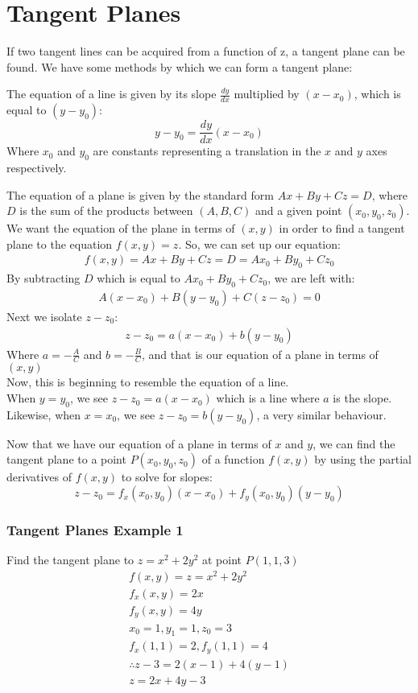 \documentclass[12pt]{article}
\begin{document}
\section{Tangent Planes}
If two tangent lines can be acquired from a function of z, a tangent plane can be found. We have some methods by which we can form a tangent plane:

\noindent The equation of a line is given by its slope \(\frac{dy}{dx}\) multiplied by \((x-x_0)\), which is equal to \((y-y_0)\):
\[
	y-y_0 = \frac{dy}{dx}(x-x_0)
\]
Where \(x_0\) and \(y_0\) are constants representing a translation in the \(x\) and \(y\) axes respectively.

\noindent The equation of a plane is given by the standard form \(Ax + By + Cz = D\), where \(D\) is the sum of the products between \((A,B,C)\) and a given point \((x_0, y_0, z_0)\).\\
We want the equation of the plane in terms of \((x,y)\) in order to find a tangent plane to the equation \(f(x,y)= z\). So, we can set up our equation:
\begin{align}
	f(x,y) = Ax + By + Cz = D = Ax_0 + By_0 + Cz_0
\end{align}
By subtracting \(D\) which is equal to \(Ax_0 + By_0 + Cz_0\), we are left with:
\begin{align}
	A(x-x_0) + B(y-y_0) + C(z-z_0) = 0
\end{align}
Next we isolate \(z-z_0\):
\begin{align}
	z-z_0=a(x-x_0) + b(y-y_0)  
\end{align}
Where \(a=-\frac{A}{C}\) and \(b = -\frac{B}{C}\), and that is our equation of a plane in terms of \((x,y)\)\\
Now, this is beginning to resemble the equation of a line.\\
When \(y=y_0\), we see \(z-z_0 = a(x-x_0)\) which is a line where \(a\) is the slope.\\
Likewise, when \(x=x_0\), we see \(z-z_0 = b(y-y_0)\), a very similar behaviour.

\noindent Now that we have our equation of a plane in terms of \(x\) and \(y\), we can find the tangent plane to a point \(P(x_0,y_0,z_0)\) of a function \(f(x,y)\) by using the partial derivatives of \(f(x,y)\) to solve for slopes:
\[
	z-z_0 = f_x(x_0,y_0)(x-x_0) + f_y(x_0,y_0)(y-y_0)
\]

\subsubsection{Tangent Planes Example 1}
Find the tangent plane to \(z= x^2 + 2y^2\) at point \(P(1,1,3)\) 
\begin{align}
		f(x,y) = z = x^2 + 2y^2\\
		f_x(x,y) = 2x \\
		f_y(x,y) = 4y \\
		\nonumber x_0 = 1, y_1 = 1, z_0 = 3\\
		\nonumber f_x(1,1) = 2, f_y(1,1) = 4 \\
\therefore		z - 3 = 2(x-1) + 4(y-1) \\
		z = 2x + 4y - 3
\end{align}
\end{document}
